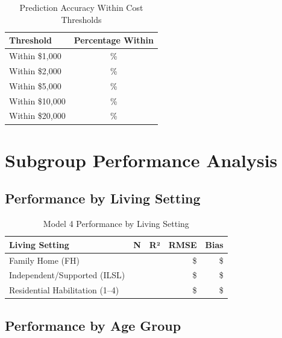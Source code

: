 \begin{table}[h]
\centering
\caption{Prediction Accuracy Within Cost Thresholds}
\begin{tabular}{lc}
\toprule
\textbf{Threshold} & \textbf{Percentage Within} \\
\midrule
Within \$1,000 & \ModelFourWithinOneK{}\% \\
Within \$2,000 & \ModelFourWithinTwoK{}\% \\
Within \$5,000 & \ModelFourWithinFiveK{}\% \\
Within \$10,000 & \ModelFourWithinTenK{}\% \\
Within \$20,000 & \ModelFourWithinTwentyK{}\% \\
\bottomrule
\end{tabular}
\end{table}

\section{Subgroup Performance Analysis}

\subsection{Performance by Living Setting}

\begin{table}[h]
\centering
\caption{Model 4 Performance by Living Setting}
\begin{tabular}{lrrrr}
\toprule
\textbf{Living Setting} & \textbf{N} & \textbf{R²} & \textbf{RMSE} & \textbf{Bias} \\
\midrule
Family Home (FH) & \ModelFourSubgrouplivingFHN{} & \ModelFourSubgrouplivingFHRSquared{} & \$\ModelFourSubgrouplivingFHRMSE{} & \$\ModelFourSubgrouplivingFHBias{} \\
Independent/Supported (ILSL) & \ModelFourSubgrouplivingILSLN{} & \ModelFourSubgrouplivingILSLRSquared{} & \$\ModelFourSubgrouplivingILSLRMSE{} & \$\ModelFourSubgrouplivingILSLBias{} \\
Residential Habilitation (1--4) & \ModelFourSubgrouplivingRHOneToFourN{} & \ModelFourSubgrouplivingRHOneToFourRSquared{} & \$\ModelFourSubgrouplivingRHOneToFourRMSE{} & \$\ModelFourSubgrouplivingRHOneToFourBias{} \\
\bottomrule
\end{tabular}
\end{table}

\subsection{Performance by Age Group}

